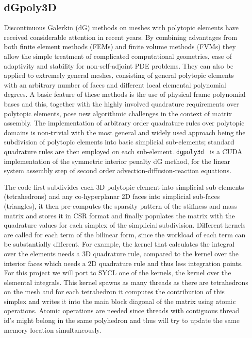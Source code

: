 \documentclass[../main]{subfiles}
\begin{document}
\subsection{dGpoly3D}\label{sec:dgpoly3d}

Discontinuous Galerkin (dG) methods on meshes with polytopic elements have received considerable attention in recent years.
By combining advantages from both finite element methods (FEMs) and finite volume methods (FVMs) they allow the simple treatment of complicated computational geometries, ease of adaptivity and stability for non-self-adjoint PDE problems.
They can also be applied to extremely general meshes, consisting of general polytopic elements with an arbitrary number of faces and different local elemental polynomial degrees.
A basic feature of these methods is the use of physical frame polynomial bases and this, together with the highly involved quadrature requirements over polytopic elements, pose new algorithmic challenges in the context of matrix assembly.
The implementation of arbitrary order quadrature rules over polytopic domains is non-trivial with the most general and widely used approach being the subdivision of polytopic elements into basic simplicial sub-elements; standard quadrature rules are then employed on each sub-element.
\texttt{dgpoly3d}~\cite{dong_gpu-accelerated_2021} is a CUDA implementation of the symmetric interior penalty dG method, for the linear system assembly step of second order advection-diffusion-reaction equations.

The code first subdivides each 3D polytopic element into simplicial sub-elements (tetrahedrons) and any co-hyperplanar 2D faces into simplicial sub-faces (triangles), it then pre-computes the sparsity pattern of the stiffness and mass matrix and stores it in CSR format and finally populates the matrix with the quadrature values for each simplex of the simplicial subdivision.
Different kernels are called for each term of the bilinear form, since the workload of each term can be substantially different.
For example, the kernel that calculates the integral over the elements needs a 3D quadrature rule, compared to the kernel over the interior faces which needs a 2D quadrature rule and thus less integration points.
For this project we will port to SYCL one of the kernels, the kernel over the elemental integrals.
This kernel spawns as many threads as there are tetrahedrons on the mesh and for each tetrahedron it computes the contribution of this simplex and writes it into the main block diagonal of the matrix using atomic operations.
Atomic operations are needed since threads with contiguous thread id's might belong in the same polyhedron and thus will try to update the same memory location simultaneously.
\end{document}
